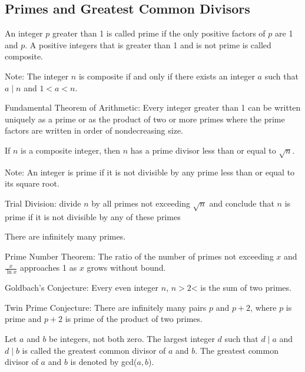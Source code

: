 \documentclass[12pt]{article}
\begin{document}
\subsection{Primes and Greatest Common Divisors}
\begin{definition} An integer $p$ greater than 1 is called prime if the only positive factors of $p$ are 1 and $p$. A positive integers that is greater than 1 and is not prime is called composite. \end{definition} 
Note: The integer $n$ is composite if and only if there exists an integer $a$ such that $a \mid n $ and $1 < a < n$. 
\begin{theorem} Fundamental Theorem of Arithmetic: Every integer greater than 1 can be written uniquely as a prime or as the product of two or more primes where the prime factors are written in order of nondecreasing size. \end{theorem} 
\begin{theorem} If $n$ is a composite integer, then $n$ has a prime divisor less than or equal to $\sqrt{n}$. \end{theorem} 
Note: An integer is prime if it is not divisible by any prime less than or equal to its square root. 
\begin{alg} Trial Division: divide $n$ by all primes not exceeding $\sqrt{n}$ and conclude that $n$ is prime if it is not divisible by any of these primes \end{alg} 
\begin{theorem} There are infinitely many primes. \end{theorem} 
\begin{theorem} Prime Number Theorem: The ratio of the number of primes not exceeding $x$ and $\frac{x}{\ln x}$ approaches 1 as $x$ grows without bound. \end{theorem} 
\begin{theorem} Goldbach's Conjecture: Every even integer $n$, $n >2$< is the sum of two primes. \end{theorem}
\begin{theorem} Twin Prime Conjecture: There are infinitely many pairs $p$ and $p + 2$, where $p$ is prime and $p + 2$ is prime of the product of two primes. \end{theorem} 
\begin{definition} Let $a$ and $b$ be integers, not both zero. The largest integer $d$ such that $d \mid a$ and $d \mid b$ is called the greatest common divisor of $a$ and $b$. The greatest common divisor of $a$ and $b$ is denoted by gcd($a, b$). \end{definition} 
\end{document}
